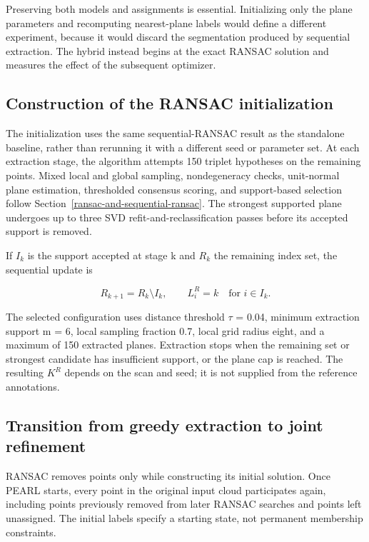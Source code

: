 Preserving both models and assignments is essential. Initializing only the plane parameters and recomputing nearest-plane labels would define a different experiment, because it would discard the segmentation produced by sequential extraction. The hybrid instead begins at the exact RANSAC solution and measures the effect of the subsequent optimizer.

\subsection{Construction of the RANSAC initialization}\label{construction-of-the-ransac-initialization}

The initialization uses the same sequential-RANSAC result as the standalone baseline, rather than rerunning it with a different seed or parameter set. At each extraction stage, the algorithm attempts 150 triplet hypotheses on the remaining points. Mixed local and global sampling, nondegeneracy checks, unit-normal plane estimation, thresholded consensus scoring, and support-based selection follow Section~\ref{ransac-and-sequential-ransac}. The strongest supported plane undergoes up to three SVD refit-and-reclassification passes before its accepted support is removed.

If \(I_{k}\) is the support accepted at stage k and \(R_{k}\) the remaining index set, the sequential update is

\begin{equation}
R_{k+1}=R_k\setminus I_k,\qquad L_i^R=k\quad\text{for }i\in I_k.
\label{eq:46}
\end{equation}

The selected configuration uses distance threshold \(\tau\) = 0.04, minimum extraction support m = 6, local sampling fraction 0.7, local grid radius eight, and a maximum of 150 extracted planes. Extraction stops when the remaining set or strongest candidate has insufficient support, or the plane cap is reached. The resulting \(K^{R}\) depends on the scan and seed; it is not supplied from the reference annotations.

\subsection{Transition from greedy extraction to joint refinement}\label{transition-from-greedy-extraction-to-joint-refinement}

RANSAC removes points only while constructing its initial solution. Once PEARL starts, every point in the original input cloud participates again, including points previously removed from later RANSAC searches and points left unassigned. The initial labels specify a starting state, not permanent membership constraints.

